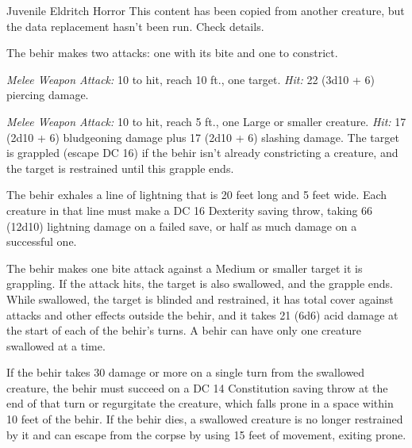 \documentclass[10pt,a4paper,twoside,bg=print,twocolumn,openany,nodeprecatedcode]{dndbook}
\begin{document}
\begin{DndMonster}[float=t]{Juvenile Eldritch Horror}
\DndMonsterBasics[
armor-class = {17 (natural armor)},
hit-points = {\DndDice{16d12 + 64}},
speed = {50 ft., climb 40 ft.}
]
\DndMonsterAbilityScores[
 str = 23,
 dex = 16,
 con = 18,
 int = 7,
 wis = 14,
 cha = 12
]
\DndMonsterDetails[
skills = {Perception +6, Stealth +7},
damage-immunities = {lightning},
senses = {darkvision 90 ft., passive perception 16},
languages = {Draconic},
challenge = 11,
]
This content has been copied from another creature, but the data replacement hasn't been run. Check details.

The behir makes two attacks: one with its bite and one to constrict.

\textsl{Melee Weapon Attack:} 10 to hit, reach 10 ft., one target. \textsl{Hit:} 22 (3d10 + 6) piercing damage.

\textsl{Melee Weapon Attack:} 10 to hit, reach 5 ft., one Large or smaller creature. \textsl{Hit:} 17 (2d10 + 6) bludgeoning damage plus 17 (2d10 + 6) slashing damage. The target is grappled (escape DC 16) if the behir isn't already constricting a creature, and the target is restrained until this grapple ends.

The behir exhales a line of lightning that is 20 feet long and 5 feet wide. Each creature in that line must make a DC 16 Dexterity saving throw, taking 66 (12d10) lightning damage on a failed save, or half as much damage on a successful one.

The behir makes one bite attack against a Medium or smaller target it is grappling. If the attack hits, the target is also swallowed, and the grapple ends. While swallowed, the target is blinded and restrained, it has total cover against attacks and other effects outside the behir, and it takes 21 (6d6) acid damage at the start of each of the behir's turns. A behir can have only one creature swallowed at a time.

If the behir takes 30 damage or more on a single turn from the swallowed creature, the behir must succeed on a DC 14 Constitution saving throw at the end of that turn or regurgitate the creature, which falls prone in a space within 10 feet of the behir. If the behir dies, a swallowed creature is no longer restrained by it and can escape from the corpse by using 15 feet of movement, exiting prone.

\end{DndMonster}
\end{document}
